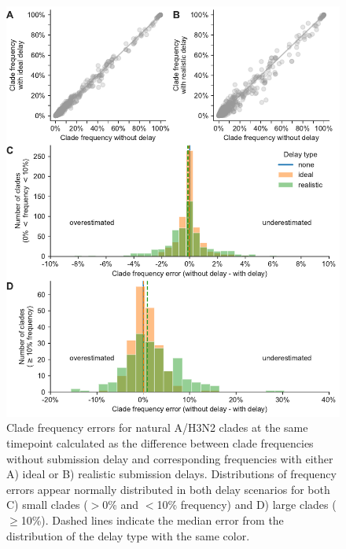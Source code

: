 \documentclass[9pt,lineno]{elife}
\begin{document}
\begin{figure}[htb!]
\includegraphics[width=\linewidth]{figures/h3n2_current_frequency_errors_by_delay}
\caption{Clade frequency errors for natural A/H3N2 clades at the same timepoint calculated as the difference between clade frequencies without submission delay and corresponding frequencies with either A) ideal or B) realistic submission delays.
Distributions of frequency errors appear normally distributed in both delay scenarios for both C) small clades ($>$0\% and $<$10\% frequency) and D) large clades ($\ge$10\%).
Dashed lines indicate the median error from the distribution of the delay type with the same color.}
\label{fig:h3n2_current_clade_frequency_errors}
%

\end{figure}
\end{document}

